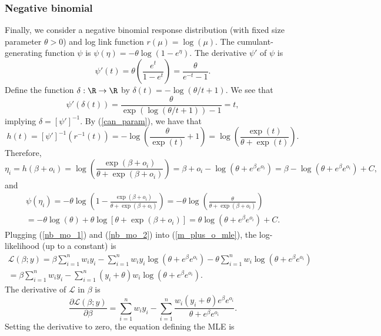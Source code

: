 \documentclass[11pt]{article}
\begin{document}
\begin{appendices}
\begin{refsection}
\subsubsection*{Negative binomial}
Finally, we consider a negative binomial response distribution (with fixed size parameter $\theta > 0$) and log link function $r(\mu) = \log(\mu)$. The cumulant-generating function $\psi$ is
$\psi(\eta) = -\theta \log(1 - e^\eta).$ The derivative $\psi'$ of $\psi$ is
$$ \psi'(t) = \theta \left(\frac{e^t}{1 - e^t}\right) = \frac{\theta}{e^{-t} - 1}.$$ Define the function $\delta: \R \to \R$ by $\delta(t) = -\log\left(\theta/t + 1 \right).$ We see that
$$\psi'(\delta(t)) = \frac{\theta}{\exp\left(\log(\theta/t + 1 )\right) - 1} = t,$$ implying $\delta = [\psi']^{-1}.$ By (\ref{can_param}), we have that
$$
h(t) = [\psi']^{-1}(r^{-1}(t)) = -\log\left(\frac{\theta}{\exp(t)} + 1 \right) = \log\left(\frac{\exp(t)}{\theta + \exp(t)}\right).
$$
Therefore,
\begin{equation}\label{nb_mo_1}
\eta_i = h(\beta + o_i) = \log\left(\frac{\exp(\beta+o_i)}{\theta + \exp(\beta + o_i)} \right) = \beta + o_i - \log\left(\theta + e^{\beta}e^{o_i}\right) = \beta - \log\left(\theta + e^{\beta}e^{o_i} \right) + C,
\end{equation}
 and
 \begin{multline}\label{nb_mo_2}
 \psi(\eta_i) = -\theta\log\left(1 - \frac{\exp(\beta+o_i)}{\theta + \exp(\beta + o_i)} \right) = -\theta \log \left(\frac{\theta}{\theta + \exp(\beta + o_i)} \right) \\ = -\theta \log (\theta) + \theta \log[\theta + \exp(\beta + o_i)] = \theta \log(\theta + e^{\beta}e^{o_i}) + C.
 \end{multline}
 Plugging (\ref{nb_mo_1}) and (\ref{nb_mo_2}) into (\ref{m_plus_o_mle}), the log-likelihood (up to a constant) is
\begin{multline*}
\mathcal{L}(\beta; y) = \beta \sum_{i=1}^n w_i y_i - \sum_{i=1}^n w_i y_i \log(\theta + e^\beta e^{o_i}) - \theta \sum_{i=1}^n w_i \log(\theta + e^\beta  e^{o_i}) \\ = \beta \sum_{i=1}^n w_i y_i - \sum_{i=1}^n (y_i + \theta)w_i\log(\theta + e^\beta e^{o_i}).
\end{multline*}
The derivative of $\mathcal{L}$ in $\beta$ is
$$\frac{\partial \mathcal{L}(\beta;y)}{\partial \beta} = \sum_{i=1}^n w_i y_i  - \sum_{i=1}^n \frac{w_i(y_i + \theta) e^{\beta} e^{o_i}}{ \theta + e^{\beta} e^{o_i}}.$$
Setting the derivative to zero, the equation defining the MLE is
\begin{equation}\label{nb_mle}

\end{equation}
\end{refsection}
\end{appendices}
\end{document}
